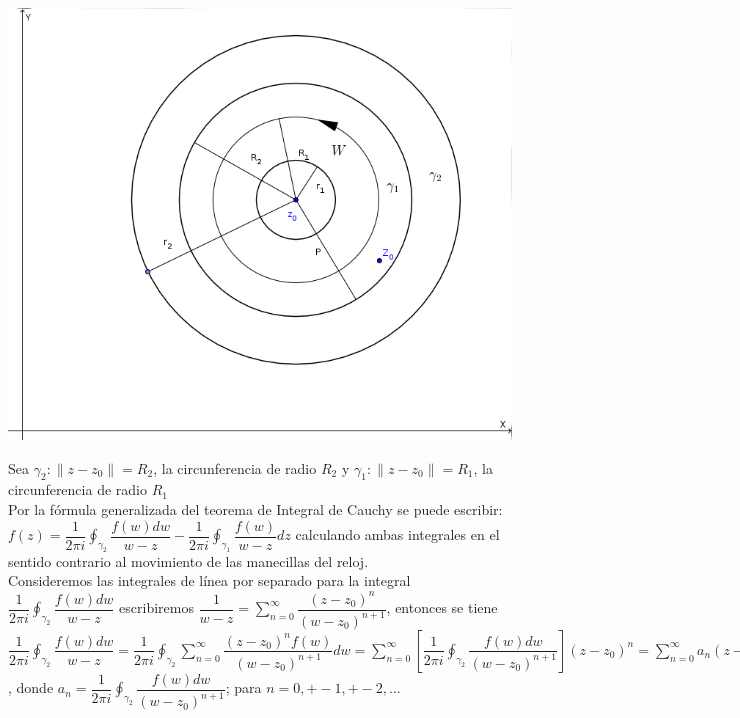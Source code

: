 \documentclass[10pt,a4paper]{article}
\begin{document}
\begin{center}
\includegraphics[scale=0.25]{6.png}
\end{center}
Sea $\gamma_2 : \parallel z - z_0 \parallel = R_2$, la circunferencia de radio $R_2$ y $\gamma_1 : \parallel z -z_0 \parallel = R_1$, la circunferencia de radio $R_1$\\
Por la fórmula generalizada del teorema de Integral de Cauchy se puede escribir: \\
$\displaystyle{f(z) = \dfrac{1}{2 \pi i} \oint_{\gamma_2} \dfrac{f(w)dw}{w-z} - \dfrac{1}{2 \pi i} \oint_{\gamma_1} \dfrac{f(w)}{w-z}dz }$		
calculando ambas integrales en el sentido contrario al movimiento de las manecillas del reloj. \\
Consideremos las integrales de línea por separado para la integral $\displaystyle{\dfrac{1}{2 \pi i} \oint_{\gamma_2} \dfrac{f(w)dw}{w-z}}$ escribiremos $\displaystyle{\dfrac{1}{w-z} = \sum_{n=0}^{\infty} \dfrac{(z-z_0)^n}{(w-z_0)^{n+1}}}$, entonces se tiene\\
$\displaystyle{\dfrac{1}{2 \pi i} \oint_{\gamma_2} \dfrac{f(w)dw}{w-z} = \dfrac{1}{2 \pi i} \oint_{\gamma_2} \sum_{n=0}^{\infty}  \dfrac{(z-z_0)^n f(w)}{(w-z_0)^{n+1}} dw =  \sum_{n=0}^{\infty} [ \dfrac{1}{2 \pi i} \oint_{\gamma_2} \dfrac{f(w) dw}{(w-z_0)^{n+1}}] (z-z_0)^n=\sum_{n = 0}^{\infty} a_n (z-z_0)^n}$ , donde $\displaystyle{a_n = \dfrac{1}{2 \pi i} \oint_{\gamma_2} \dfrac{f(w) dw}{(w-z_0)^{n+1}}}$; para $\displaystyle{n = 0,+-1,+-2,...}$ \\
\end{document}
